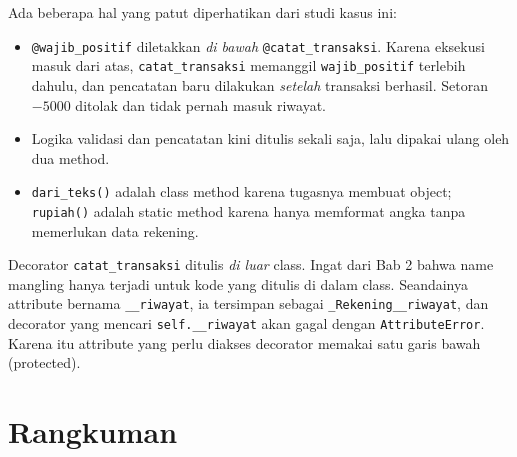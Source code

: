 Ada beberapa hal yang patut diperhatikan dari studi kasus ini:

\begin{itemize}
  \item \texttt{@wajib\_positif} diletakkan \emph{di bawah} \texttt{@catat\_transaksi}. Karena eksekusi masuk dari atas, \texttt{catat\_transaksi} memanggil \texttt{wajib\_positif} terlebih dahulu, dan pencatatan baru dilakukan \emph{setelah} transaksi berhasil. Setoran $-5000$ ditolak dan tidak pernah masuk riwayat.
  \item Logika validasi dan pencatatan kini ditulis sekali saja, lalu dipakai ulang oleh dua method.
  \item \texttt{dari\_teks()} adalah class method karena tugasnya membuat object; \texttt{rupiah()} adalah static method karena hanya memformat angka tanpa memerlukan data rekening.
\end{itemize}

\begin{penting}
Decorator \texttt{catat\_transaksi} ditulis \emph{di luar} class. Ingat dari Bab 2 bahwa name mangling hanya terjadi untuk kode yang ditulis di dalam class. Seandainya attribute bernama \texttt{\_\_riwayat}, ia tersimpan sebagai \texttt{\_Rekening\_\_riwayat}, dan decorator yang mencari \texttt{self.\_\_riwayat} akan gagal dengan \texttt{AttributeError}. Karena itu attribute yang perlu diakses decorator memakai satu garis bawah (protected).
\end{penting}

\section{Rangkuman}


